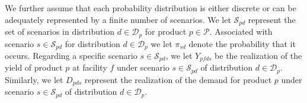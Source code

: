 \documentclass[12pt]{article}
\theoremstyle{thmstylethree}%
\begin{document}
We further assume that each probability distribution is either discrete or can be adequately represented by a finite number of scenarios. We let $\mathcal{S}_{pd}$ represent the set of scenarios in distribution $d \in \mathcal{D}_p$ for product $p \in \mathcal{P}$. Associated with scenario $s \in \mathcal{S}_{pd}$ for distribution $d \in \mathcal{D}_{p}$ we let $\pi_{sd}$ denote the probability that it occurs. Regarding a specific scenario $s \in \mathcal{S}_{pd}$, we let $Y_{pfds}$ be the realization of the yield of product $p$ at facility $f$ under scenario $s\in\mathcal{S}_{pd}$ of distribution $d\in\mathcal{D}_{p}$. Similarly, we let $D_{pds}$ represent the realization of the demand for product $p$ under scenario $s\in\mathcal{S}_{pd}$ of distribution $d\in\mathcal{D}_p$.


\begin{figure}
    \centering
    



\begin{tikzpicture}[x=0.75pt,y=0.75pt,yscale=-1,xscale=1]


\end{tikzpicture}
\end{figure}
\end{document}
